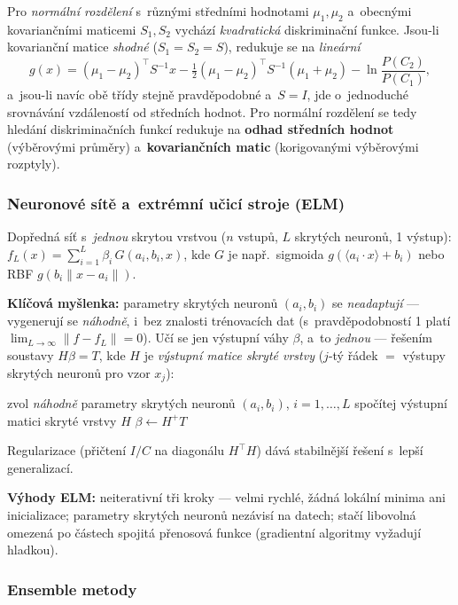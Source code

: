 \documentclass[11pt,a4paper]{article}
\theoremstyle{definition}
\begin{document}
Pro \emph{normální rozdělení} s~různými středními hodnotami $\mu_1,\mu_2$ a~obecnými
kovariančními maticemi $S_1,S_2$ vychází \emph{kvadratická} diskriminační funkce. Jsou-li
kovarianční matice \emph{shodné} ($S_1=S_2=S$), redukuje se na \emph{lineární}
\[ g(x)=(\mu_1-\mu_2)^{\!\top}S^{-1}x-\tfrac12(\mu_1-\mu_2)^{\!\top}S^{-1}(\mu_1+\mu_2)
   -\ln\frac{P(C_2)}{P(C_1)}, \]
a~jsou-li navíc obě třídy stejně pravděpodobné a~$S=I$, jde o~jednoduché srovnávání
vzdáleností od středních hodnot. Pro normální rozdělení se tedy hledání diskriminačních
funkcí redukuje na \textbf{odhad středních hodnot} (výběrovými průměry) a~\textbf{kovariančních
matic} (korigovanými výběrovými rozptyly).

\subsubsection{Neuronové sítě a~extrémní učicí stroje (ELM)}

\begin{defbox}
Dopředná síť s~\emph{jednou} skrytou vrstvou ($n$ vstupů, $L$ skrytých neuronů, 1 výstup):
$f_L(x)=\sum_{i=1}^{L}\beta_i\,G(a_i,b_i,x)$, kde $G$ je např.\ sigmoida
$g(\langle a_i\cdot x\rangle+b_i)$ nebo RBF $g(b_i\|x-a_i\|)$.

\textbf{Klíčová myšlenka:} parametry skrytých neuronů $(a_i,b_i)$ se \emph{neadaptují} ---
vygenerují se \emph{náhodně}, i~bez znalosti trénovacích dat (s~pravděpodobností 1 platí
$\lim_{L\to\infty}\|f-f_L\|=0$). Učí se jen výstupní váhy $\beta$, a~to \emph{jednou} ---
řešením soustavy $H\beta=T$, kde $H$ je \emph{výstupní matice skryté vrstvy} ($j$-tý řádek
$=$ výstupy skrytých neuronů pro vzor $x_j$):
\begin{algorithmic}[1]
\State zvol \emph{náhodně} parametry skrytých neuronů $(a_i,b_i)$, $i=1,\dots,L$
\State spočítej výstupní matici skryté vrstvy $H$
\State $\beta\gets H^{+}T$ 
\end{algorithmic}
Regularizace (přičtení $I/C$ na diagonálu $H^{\!\top}H$) dává stabilnější řešení s~lepší
generalizací.
\end{defbox}

\textbf{Výhody ELM:} neiterativní tři kroky --- velmi rychlé, žádná lokální minima ani
inicializace; parametry skrytých neuronů nezávisí na datech; stačí libovolná omezená po
částech spojitá přenosová funkce (gradientní algoritmy vyžadují hladkou).

\subsubsection{Ensemble metody}
\end{document}
